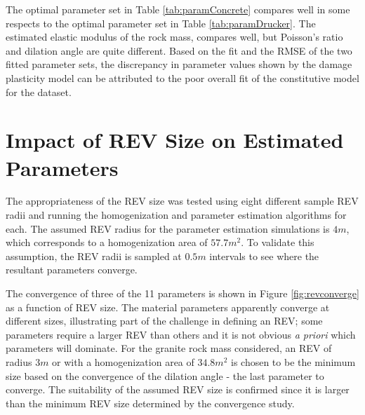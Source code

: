 The optimal parameter set in Table \ref{tab:paramConcrete} compares well in some respects to the optimal parameter set in Table \ref{tab:paramDrucker}. The estimated elastic modulus of the rock mass, compares well, but Poisson's ratio and dilation angle are quite different. Based on the fit and the RMSE of the two fitted parameter sets, the discrepancy in parameter values shown by the damage plasticity model can be attributed to the poor overall fit of the constitutive model for the dataset. 

\section{Impact of REV Size on Estimated Parameters}

The appropriateness of the REV size was tested using eight different sample REV radii and running the homogenization and parameter estimation algorithms for each. The assumed REV radius for the parameter estimation simulations is $4m$, which corresponds to a homogenization area of $57.7 m^2$. To validate this assumption, the REV radii is sampled at $0.5m$ intervals to see where the resultant parameters converge.

The convergence of three of the 11 parameters is shown in Figure \ref{fig:revconverge} as a function of REV size. The material parameters apparently converge at different sizes, illustrating part of the challenge in defining an REV; some parameters require a larger REV than others and it is not obvious \textit{a priori} which parameters will dominate. For the granite rock mass considered, an REV of radius $3m$ or with a homogenization area of $34.8 m^2$ is chosen to be the minimum size based on the convergence of the dilation angle - the last parameter to converge. The suitability of the assumed REV size is confirmed since it is larger than the minimum REV size determined by the convergence study.

